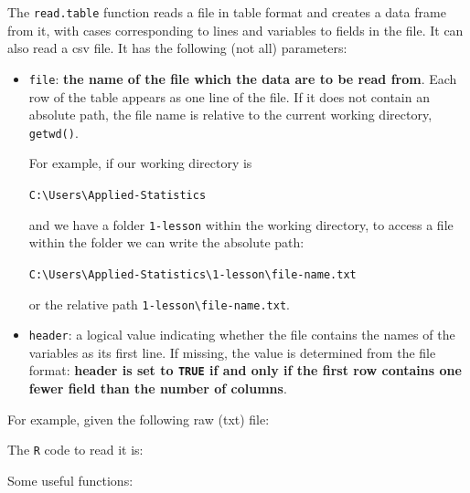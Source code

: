 \documentclass[a4paper]{article}
\begin{document}
    The \texttt{read.table} function reads a file in table format and creates a data frame from it, with cases corresponding to lines and variables to fields in the file. It can also read a csv file. It has the following (not all) parameters:
    \begin{itemize}
        \item \texttt{file}: \textbf{the name of the file which the data are to be read from}. Each row of the table appears as one line of the file. If it does not contain an absolute path, the file name is relative to the current working directory, \texttt{getwd()}. 
        
        For example, if our working directory is 
        \begin{center}
            \texttt{C:\textbackslash Users\textbackslash Applied-Statistics}
        \end{center}
        and we have a folder \texttt{1-lesson} within the working directory, to access a file within the folder we can write the absolute path:
        \begin{center}
            \texttt{C:\textbackslash Users\textbackslash Applied-Statistics\textbackslash 1-lesson\textbackslash file-name.txt}
        \end{center}
        or the relative path \texttt{1-lesson\textbackslash file-name.txt}.

        \item \texttt{header}: a logical value indicating whether the file contains the names of the variables as its first line. If missing, the value is determined from the file format: \textbf{header is set to \texttt{TRUE} if and only if the first row contains one fewer field than the number of columns}.
    \end{itemize}
    For example, given the following raw (txt) file:\label{code: read.table - raw file}
    
    The \texttt{R} code to read it is:
    
    Some useful functions:
\end{document}
